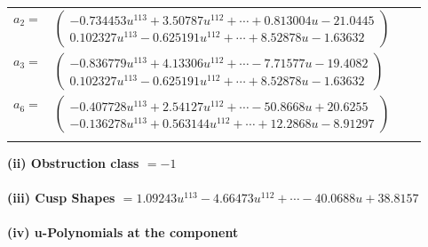 \documentclass[1p]{elsarticle_modified}
\theoremstyle{definition}
\begin{document}
\begin{tabular}{m{7pt} m{180pt} m{7pt} m{180pt} }
\flushright $a_{2}=$&$\begin{pmatrix}-0.734453 u^{113}+3.50787 u^{112}+\cdots+0.813004 u-21.0445\\0.102327 u^{113}-0.625191 u^{112}+\cdots+8.52878 u-1.63632\end{pmatrix}$ \\
\flushright $a_{3}=$&$\begin{pmatrix}-0.836779 u^{113}+4.13306 u^{112}+\cdots-7.71577 u-19.4082\\0.102327 u^{113}-0.625191 u^{112}+\cdots+8.52878 u-1.63632\end{pmatrix}$ \\
\flushright $a_{6}=$&$\begin{pmatrix}-0.407728 u^{113}+2.54127 u^{112}+\cdots-50.8668 u+20.6255\\-0.136278 u^{113}+0.563144 u^{112}+\cdots+12.2868 u-8.91297\end{pmatrix}$\\&\end{tabular}
\flushleft \textbf{(ii) Obstruction class $= -1$}\\~\\
\flushleft \textbf{(iii) Cusp Shapes $= 1.09243 u^{113}-4.66473 u^{112}+\cdots-40.0688 u+38.8157$}\\~\\
\newpage\renewcommand{\arraystretch}{1}
\flushleft \textbf{(iv) u-Polynomials at the component}\newline \\
\end{document}
